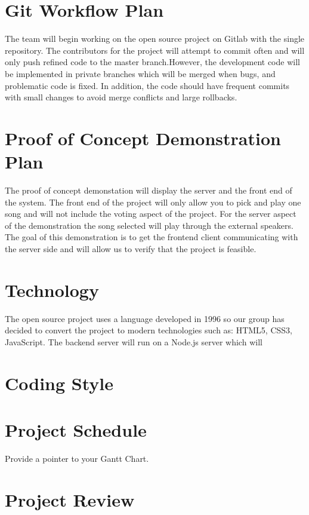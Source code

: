 \documentclass{article}
\begin{document}
\section{Git Workflow Plan}
The team will begin working on the open source project on Gitlab with the single repository. The contributors for the project will attempt to commit often and will only push refined code to the master branch.However, the development code will be implemented in private branches which will be merged when bugs, and problematic code is fixed. In addition, the code should have frequent commits with small changes to avoid merge conflicts and large rollbacks.
\section{Proof of Concept Demonstration Plan}
The proof of concept demonstation will display the server and the front end of the system. The front end of the project will only allow you to pick and play one song and will not include the voting aspect of the project. For the server aspect of the demonstration the song selected will play through the external speakers. The goal of this demonstration is to get the frontend client communicating with the server side and will allow us to verify that the project is feasible.
\section{Technology}
The open source project uses a language developed in 1996 so our group has decided to convert the project to modern technologies such as: HTML5, CSS3, JavaScript. The backend server will run on a Node.js server which will 

\section{Coding Style}

\section{Project Schedule}

Provide a pointer to your Gantt Chart.

\section{Project Review}
\end{document}
